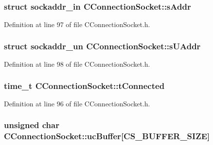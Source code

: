 \hypertarget{class_c_connection_socket_ad6faf61267b6f4a6f8d389a8bceac45d}{
\subsubsection[{s\-Addr}]{\setlength{\rightskip}{0pt plus 5cm}struct sockaddr\-\_\-in {\bf \-C\-Connection\-Socket\-::s\-Addr}}}\label{class_c_connection_socket_ad6faf61267b6f4a6f8d389a8bceac45d}


\-Definition at line 97 of file \-C\-Connection\-Socket.\-h.

\hypertarget{class_c_connection_socket_aee6bfbd64246bf4c8be8b23acb9e124e}{
\subsubsection[{s\-U\-Addr}]{\setlength{\rightskip}{0pt plus 5cm}struct sockaddr\-\_\-un {\bf \-C\-Connection\-Socket\-::s\-U\-Addr}}}\label{class_c_connection_socket_aee6bfbd64246bf4c8be8b23acb9e124e}


\-Definition at line 98 of file \-C\-Connection\-Socket.\-h.

\hypertarget{class_c_connection_socket_a831e97fbbea5727f1865f14cda4685cb}{
\subsubsection[{t\-Connected}]{\setlength{\rightskip}{0pt plus 5cm}time\-\_\-t {\bf \-C\-Connection\-Socket\-::t\-Connected}}}\label{class_c_connection_socket_a831e97fbbea5727f1865f14cda4685cb}


\-Definition at line 96 of file \-C\-Connection\-Socket.\-h.

\hypertarget{class_c_connection_socket_abc2fd15e5e9f2f3e112012bdbe0b5c94}{
\subsubsection[{uc\-Buffer}]{\setlength{\rightskip}{0pt plus 5cm}unsigned char {\bf \-C\-Connection\-Socket\-::uc\-Buffer}\mbox{[}{\bf \-C\-S\-\_\-\-B\-U\-F\-F\-E\-R\-\_\-\-S\-I\-Z\-E}\mbox{]}}}\label{class_c_connection_socket_abc2fd15e5e9f2f3e112012bdbe0b5c94}



